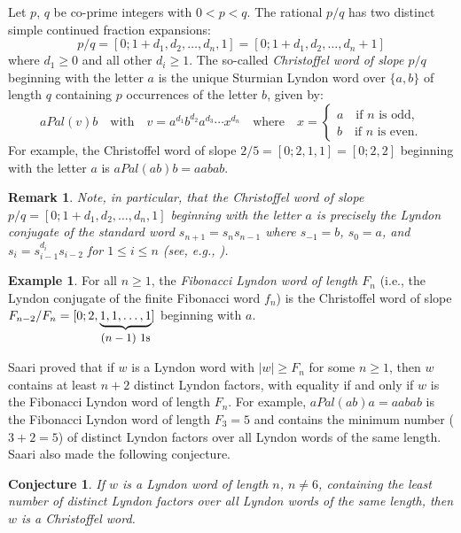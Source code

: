 \documentclass[11pt]{amsart}
\newcommand{\1}{\bar{1}}
\theoremstyle{plain}
\newtheorem{conjecture}[theorem]{Conjecture}
\newtheorem{remark}[theorem]{Remark}
\theoremstyle{definition}
\newtheorem{example}[theorem]{Example}
\theoremstyle{remark}
\begin{document}
Let $p$, $q$ be co-prime integers with $0 < p < q$. The rational $p/q$ has two distinct simple continued fraction expansions:
\[
p/q = [0; 1+d_1, d_2, \ldots, d_n, 1] = [0; 1+d_1, d_2, \ldots, d_n + 1]
\]
where $d_1 \geq 0$ and all other $d_i \geq 1$. The so-called \textit{Christoffel word of slope $p/q$} beginning with the letter $a$ is the unique Sturmian Lyndon word over $\{a,b\}$ of length $q$ containing $p$ occurrences of the letter $b$, given by:
\[
aPal(v)b \quad \mbox{with} \quad v = a^{d_1}b^{d_2}a^{d_3}\cdots x^{d_n} \quad \mbox{where} \quad x = \begin{cases} a \quad \mbox{if $n$ is odd}, \\ b \quad  \mbox{if $n$ is even}. \end{cases}
\]
For example, the Christoffel word of slope $2/5=[0;2,1,1] = [0;2,2]$ beginning with the letter $a$ is $aPal(ab)b = aabab$.  %

\begin{remark} \label{R1} Note, in particular, that the Christoffel word of slope $p/q = [0; 1+d_1, d_2, \ldots, d_n, 1]$ beginning with the letter $a$ is precisely the Lyndon conjugate of the standard word $s_{n+1}=s_ns_{n-1}$ where $s_{-1} =b$, $s_{0}=a$, and $s_i=s_{i-1}^{d_i}s_{i-2}$ for $1 \leq i \leq n$ (see, e.g., \cite{jB07stur}).
\end{remark} 

\begin{example} For all $n \geq 1$, the \textit{Fibonacci Lyndon word of length $F_n$} (i.e., the Lyndon conjugate of the finite Fibonacci word $f_n$)  is the Christoffel word of slope $F_{n-2}/F_{n} = [0;2,\underbrace{1,1, \ldots, 1}_{\mbox{\small $(n-1)$ $1$s}}]$ beginning with $a$. 
\end{example}

Saari \cite[Thm.~1]{kS14lynd} proved that if $w$ is a Lyndon word with $|w| \ge F_{n}$ for some $n \geq 1$, then $w$ contains at least $n+2$ distinct Lyndon factors, with equality if and only if $w$ is the Fibonacci Lyndon word of length $F_{n}$. For example, $aPal(ab)a = aabab$ is the Fibonacci Lyndon word of length $F_3=5$ and contains the minimum number ($3+2 = 5$) of distinct Lyndon factors over all Lyndon words of the same length. Saari also made the following conjecture.

\begin{conjecture} \cite{kS14lynd} If $w$ is a Lyndon word of length $n$, $n \not = 6$, containing the least number of distinct Lyndon factors over all Lyndon words of the same length, then $w$ is a \textit{Christoffel word}.
\end{conjecture}
\end{document}
